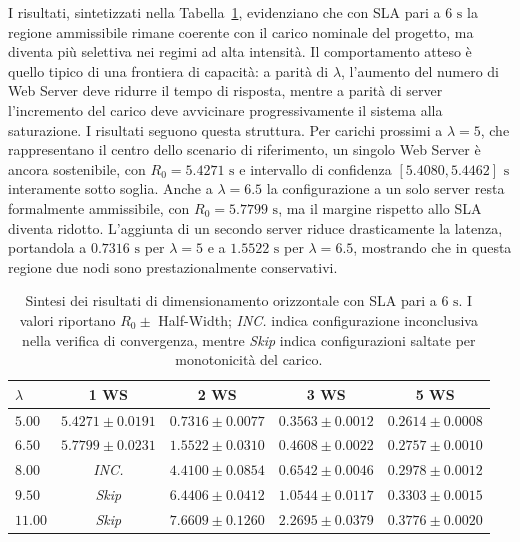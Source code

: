 ﻿\documentclass[a4paper,12pt]{article}
\begin{document}
I risultati, sintetizzati nella Tabella~\ref{tab:horizontal_scaling_results}, evidenziano che con SLA pari a $6\text{ s}$ la regione ammissibile rimane coerente con il carico nominale del progetto, ma diventa più selettiva nei regimi ad alta intensità. Il comportamento atteso è quello tipico di una frontiera di capacità: a parità di $\lambda$, l'aumento del numero di Web Server deve ridurre il tempo di risposta, mentre a parità di server l'incremento del carico deve avvicinare progressivamente il sistema alla saturazione. I risultati seguono questa struttura. Per carichi prossimi a $\lambda = 5$, che rappresentano il centro dello scenario di riferimento, un singolo Web Server è ancora sostenibile, con $R_0 = 5.4271\text{ s}$ e intervallo di confidenza $[5.4080, 5.4462]\text{ s}$ interamente sotto soglia. Anche a $\lambda = 6.5$ la configurazione a un solo server resta formalmente ammissibile, con $R_0 = 5.7799\text{ s}$, ma il margine rispetto allo SLA diventa ridotto. L'aggiunta di un secondo server riduce drasticamente la latenza, portandola a $0.7316\text{ s}$ per $\lambda = 5$ e a $1.5522\text{ s}$ per $\lambda = 6.5$, mostrando che in questa regione due nodi sono prestazionalmente conservativi.

\begin{table}[H]
    \centering
    \small
    \renewcommand{\arraystretch}{1.3}
    \begin{tabular}{lcccc}
        \hline
        \textbf{$\lambda$} & \textbf{1 WS} & \textbf{2 WS} & \textbf{3 WS} & \textbf{5 WS} \\ \hline
        $5.00$  & $5.4271 \pm 0.0191$ & $0.7316 \pm 0.0077$ & $0.3563 \pm 0.0012$ & $0.2614 \pm 0.0008$ \\
        $6.50$  & $5.7799 \pm 0.0231$ & $1.5522 \pm 0.0310$ & $0.4608 \pm 0.0022$ & $0.2757 \pm 0.0010$ \\
        $8.00$  & \textit{INC.}        & $4.4100 \pm 0.0854$ & $0.6542 \pm 0.0046$ & $0.2978 \pm 0.0012$ \\
        $9.50$  & \textit{Skip}        & $6.4406 \pm 0.0412$ & $1.0544 \pm 0.0117$ & $0.3303 \pm 0.0015$ \\
        $11.00$ & \textit{Skip}        & $7.6609 \pm 0.1260$ & $2.2695 \pm 0.0379$  & $0.3776 \pm 0.0020$ \\ \hline
    \end{tabular}
    \caption{Sintesi dei risultati di dimensionamento orizzontale con SLA pari a $6\text{ s}$. I valori riportano $R_0 \pm$ Half-Width; \textit{INC.} indica configurazione inconclusiva nella verifica di convergenza, mentre \textit{Skip} indica configurazioni saltate per monotonicità del carico.}
    \label{tab:horizontal_scaling_results}
\end{table}
\end{document}

